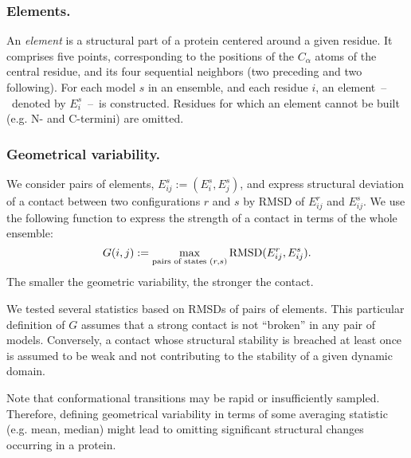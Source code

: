 \documentclass[a4paper,11pt,twoside]{book}%
\begin{document}
\subsubsection*{Elements.}
An \emph{element} is a structural part of a protein centered around a given residue.
It comprises five points, corresponding to the positions of the $C_\alpha$ atoms of the central residue, and its four sequential neighbors (two preceding and two following).
For each model $s$ in an ensemble, and each residue $i$, an element~--~denoted by $E_i^s$~--~is constructed.
Residues for which an element cannot be built (e.g. N- and C-termini) are omitted.

\subsubsection*{Geometrical variability.}
We consider pairs of elements, $E_{ij}^s := ( E_i^s , E_j^s )$, and express structural deviation of a contact between two configurations $r$ and $s$ by RMSD of $E_{ij}^r$ and $E_{ij}^s$.
We use the following function to express the strength of a contact in terms of the whole ensemble:
\begin{displaymath}
G(i,j) := \max_{\text{pairs of states }\\(r,s)} \text{RMSD}(E_{ij}^r,E_{ij}^s) .
\end{displaymath}
The smaller the geometric variability, the stronger the contact.

We tested several statistics based on RMSDs of pairs of elements.
This particular definition of $G$ assumes that a strong contact is not ``broken'' in any pair of models.
Conversely, a contact whose structural stability is breached at least once is assumed to be weak and not contributing to the stability of a given dynamic domain.

Note that conformational transitions may be rapid or insufficiently sampled.
Therefore, defining geometrical variability in terms of some averaging statistic (e.g. mean, median) might lead to omitting significant structural changes occurring in a protein.
\end{document}
